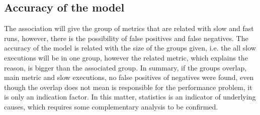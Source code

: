 \subsection{Accuracy of the model}
The association will give the group of metrics that are related with slow and fast runs, however, there is the possibility of false positives and false negatives. The accuracy of the model is related with the size of the groups given, i.e. the all slow executions will be in one group, however the related metric, which explains the reason, is bigger than the associated group.  In summary, if the groups overlap, main metric and slow executions, no false positives of negatives were found, even though the overlap does not mean is responsible for the performance problem, it is only an indication factor. In this matter, statistics is an indicator of underlying causes, which requires some complementary analysis to be confirmed.
